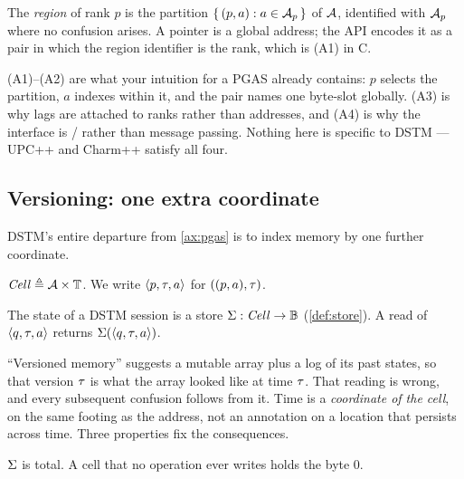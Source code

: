 \begin{definition}[Region]\label{def:region-pgas}
The \emph{region} of rank $p$ is the partition
$\{\, (p,a) : a \in \mathcal{A}_{p} \,\}$ of $\mathcal{A}$, identified with
$\mathcal{A}_{p}$ where no confusion arises. A \gls{pointer} is a global address;
the API encodes it as a  pair in which the region
identifier is the rank, which is (A1) in C.
\end{definition}

(A1)--(A2) are what your intuition for a PGAS already contains: $p$ selects
the partition, $a$ indexes within it, and the pair names one byte-slot
globally. (A3) is why lags are attached to ranks rather than addresses, and
(A4) is why the interface is / rather than message
passing. Nothing here is specific to DSTM --- UPC++ \cite{upcxx2019} and
Charm++ \cite{charmpp1993} satisfy all four.

\subsection{Versioning: one extra coordinate}
\label{sec:store-is-a-map}

DSTM's entire departure from \cref{ax:pgas} is to index memory by one further
coordinate.

\begin{definition}[Cell]\label{def:cell-pgas}
$\mathit{Cell} \triangleq \mathcal{A} \times \mathbb{T}$. We write $\langle p, \tau, a\rangle$ for
$((p,a), \tau)$.
\end{definition}

\begin{definition}\label{def:memory-model}
The state of a DSTM \gls{session} is a \gls{store}
$\Sigma : \mathit{Cell} \to \mathbb{B}$ (\cref{def:store}). A read of
$\langle q, \tau, a\rangle$ returns $\Sigma(\langle q, \tau, a\rangle)$.
\end{definition}

``Versioned memory'' suggests a mutable array plus a log of its past states,
so that version $\tau$ is what the array looked like at time $\tau$. That
reading is wrong, and every subsequent confusion follows from it. Time is a
\emph{coordinate of the cell}, on the same footing as the address, not an
annotation on a location that persists across time. Three properties fix the
consequences.

\begin{definition}\label{def:zero-default}
$\Sigma$ is total. A cell that no \gls{operation} ever writes holds the byte $0$.
\end{definition}

